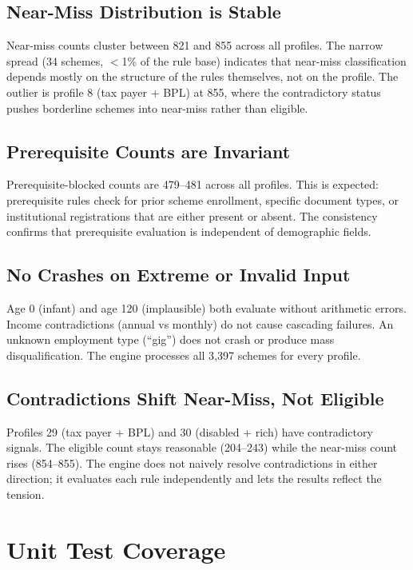 \documentclass[11pt,a4paper]{article}
\begin{document}
\subsection{Near-Miss Distribution is Stable}

Near-miss counts cluster between 821 and 855 across all profiles. The narrow spread (34 schemes, $<$1\% of the rule base) indicates that near-miss classification depends mostly on the structure of the rules themselves, not on the profile. The outlier is profile 8 (tax payer + BPL) at 855, where the contradictory status pushes borderline schemes into near-miss rather than eligible.

\subsection{Prerequisite Counts are Invariant}

Prerequisite-blocked counts are 479--481 across all profiles. This is expected: prerequisite rules check for prior scheme enrollment, specific document types, or institutional registrations that are either present or absent. The consistency confirms that prerequisite evaluation is independent of demographic fields.

\subsection{No Crashes on Extreme or Invalid Input}

Age 0 (infant) and age 120 (implausible) both evaluate without arithmetic errors. Income contradictions (annual vs monthly) do not cause cascading failures. An unknown employment type (``gig'') does not crash or produce mass disqualification. The engine processes all 3{,}397 schemes for every profile.

\subsection{Contradictions Shift Near-Miss, Not Eligible}

Profiles 29 (tax payer + BPL) and 30 (disabled + rich) have contradictory signals. The eligible count stays reasonable (204--243) while the near-miss count rises (854--855). The engine does not naively resolve contradictions in either direction; it evaluates each rule independently and lets the results reflect the tension.


\section{Unit Test Coverage}
\end{document}
